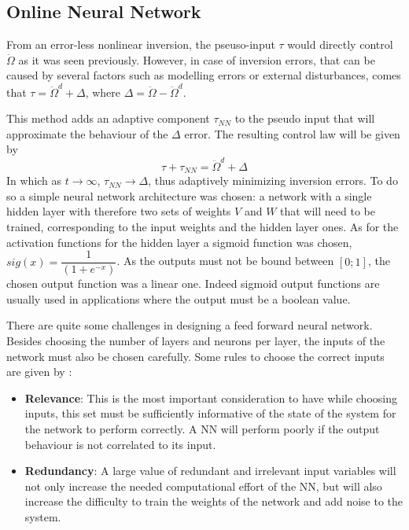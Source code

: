 \subsection{Online Neural Network}

From an error-less nonlinear inversion, the pseuso-input $\tau$ would directly control $\ddot{\Omega}$ as it was seen previously. However, in case of inversion errors, that can be caused by several factors such as modelling errors or external disturbances, comes that $\tau = \ddot{\Omega}^d + \Delta$, where $\Delta = \ddot{\Omega}- \ddot{\Omega} ^d$. 

This method adds an adaptive component $\tau_{NN}$ to the pseudo input that will approximate the behaviour of the $\Delta$ error. The resulting control law will be given by 
\begin{equation}
\tau + \tau_{NN} = \ddot{\Omega}^d + \Delta
\end{equation}
In which as $t \rightarrow \infty$, $\tau_{NN} \rightarrow \Delta$, thus adaptively minimizing inversion errors. To do so a simple neural network architecture was chosen: a network with a single hidden layer with therefore two sets of weights $V$ and $W$ that will need to be trained, corresponding to the input weights and the hidden layer ones. As for the activation functions for the hidden layer a sigmoid function was chosen, $sig(x)=\dfrac{1}{(1+e^{-x})}$. As the outputs must not be bound between $[0;1]$, the chosen output function was a linear one. Indeed sigmoid output functions are usually used in applications where the output must be a boolean value.

There are quite some challenges in designing a feed forward neural network. Besides choosing the number of layers and neurons per layer, the inputs of the network must also be chosen carefully. Some rules to choose the correct inputs are given by \cite{NN_inputs}:
\begin{itemize}
\item \textbf{Relevance}: This is the most important consideration to have while choosing inputs, this set must be sufficiently informative of the state of the system for the network to perform correctly. A NN will perform poorly if the output behaviour is not correlated to its input.
\item \textbf{Redundancy}: A large value of redundant and irrelevant input variables will not only increase the needed computational effort of the NN, but will also increase the difficulty to train the weights of the network and add noise to the system.
\end{itemize}

